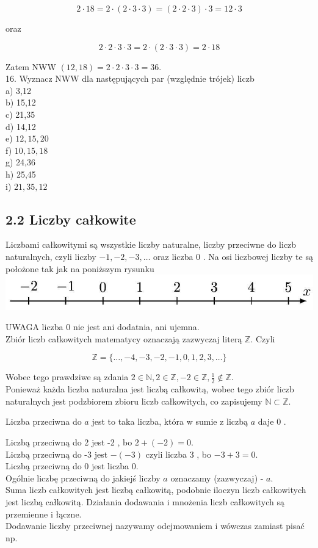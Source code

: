 \documentclass[10pt]{article}
\begin{document}
\[
2 \cdot 18=2 \cdot(2 \cdot 3 \cdot 3)=(2 \cdot 2 \cdot 3) \cdot 3=12 \cdot 3
\]

oraz

\[
2 \cdot 2 \cdot 3 \cdot 3=2 \cdot(2 \cdot 3 \cdot 3)=2 \cdot 18
\]

Zatem NWW \((12,18)=2 \cdot 2 \cdot 3 \cdot 3=36\).\\
16. Wyznacz NWW dla następujących par (względnie trójek) liczb\\
a) 3,12\\
b) 15,12\\
c) 21,35\\
d) 14,12\\
e) \(12,15,20\)\\
f) \(10,15,18\)\\
g) 24,36\\
h) 25,45\\
i) \(21,35,12\)

\subsection*{2.2 Liczby całkowite}
Liczbami całkowitymi są wszystkie liczby naturalne, liczby przeciwne do liczb naturalnych, czyli liczby \(-1,-2,-3, \ldots\) oraz liczba 0 . Na osi liczbowej liczby te są położone tak jak na poniższym rysunku\\
\includegraphics[max width=\textwidth, center]{2024_11_21_8f01584889ff06348ae7g-026}

UWAGA liczba 0 nie jest ani dodatnia, ani ujemna.\\
Zbiór liczb całkowitych matematycy oznaczają zazwyczaj literą \(\mathbb{Z}\). Czyli

\[
\mathbb{Z}=\{\ldots,-4,-3,-2,-1,0,1,2,3, \ldots\}
\]

Wobec tego prawdziwe są zdania \(2 \in \mathbb{N}, 2 \in \mathbb{Z},-2 \in \mathbb{Z}, \frac{1}{2} \notin \mathbb{Z}\).\\
Ponieważ każda liczba naturalna jest liczbą całkowitą, wobec tego zbiór liczb naturalnych jest podzbiorem zbioru liczb całkowitych, co zapisujemy \(\mathbb{N} \subset \mathbb{Z}\).

Liczba przeciwna do \(a\) jest to taka liczba, która w sumie z liczbą \(a\) daje 0 .

Liczbą przeciwną do 2 jest -2 , bo \(2+(-2)=0\).\\
Liczbą przeciwną do -3 jest \(-(-3)\) czyli liczba 3 , bo \(-3+3=0\).\\
Liczbą przeciwną do 0 jest liczba 0.\\
Ogólnie liczbę przeciwną do jakiejś liczby \(a\) oznaczamy (zazwyczaj) - \(a\).\\
Suma liczb całkowitych jest liczbą całkowitą, podobnie iloczyn liczb całkowitych jest liczbą całkowitą. Działania dodawania i mnożenia liczb całkowitych są przemienne i łączne.\\
Dodawanie liczby przeciwnej nazywamy odejmowaniem i wówczas zamiast pisać np.
\end{document}

